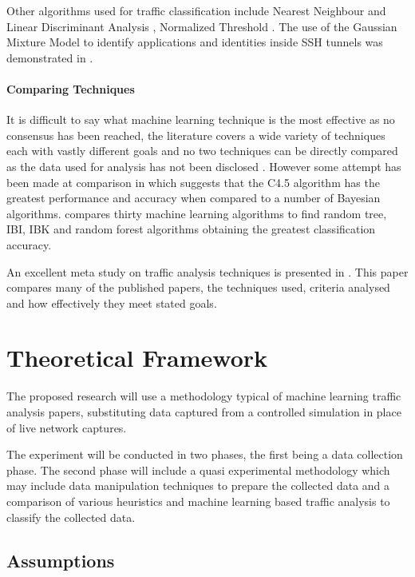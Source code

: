 \documentclass{ecuthesis}
\begin{document}
Other algorithms used for traffic classification include Nearest Neighbour and  Linear Discriminant Analysis \citep{Roughan:2004p3823}, Normalized Threshold \citep{Crotti:2007p3824}. The use of the Gaussian Mixture Model to identify applications and identities inside SSH tunnels was demonstrated in \cite{Dusi:2008p6254}.

\subsubsection{Comparing Techniques}

It is difficult to say what machine learning technique is the most effective as no consensus has been reached, the literature covers a wide variety of techniques each with vastly different goals and no two techniques can be directly compared as the data used for analysis has not been disclosed \citep{Kim:2007p3867}. However some attempt has been made at comparison in \cite{Williams:2006p3849} which suggests that the C4.5 algorithm has the greatest performance and accuracy when compared to a number of Bayesian algorithms. \cite{Mohd:2009p6484} compares thirty machine learning algorithms  to find random tree, IBI, IBK and random forest algorithms obtaining the greatest classification accuracy.

An excellent meta study on traffic analysis techniques is presented in \cite{Nguyen:2008p3837}. This paper compares many of the published papers, the techniques used, criteria analysed and how effectively they meet stated goals.

\chapter{Theoretical Framework}

The proposed research will use a methodology typical of machine learning traffic analysis papers, substituting data captured from a controlled simulation in place of live network captures. 

The experiment will be conducted in two phases, the first being a data collection phase. The second phase will include a quasi experimental methodology which may include data manipulation techniques to prepare the collected data and a comparison of various heuristics and machine learning based traffic analysis to classify the collected data.

\section{Assumptions}
\end{document}

